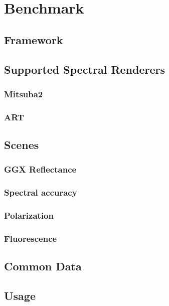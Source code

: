 \chapter{Benchmark}

\section{Framework}

\section{Supported Spectral Renderers}

\subsection{Mitsuba2}

\subsection{ART}

\section{Scenes}

\subsection{GGX Reflectance}

\subsection{Spectral accuracy}

\subsection{Polarization}

\subsection{Fluorescence}

\section{Common Data}

\section{Usage}

